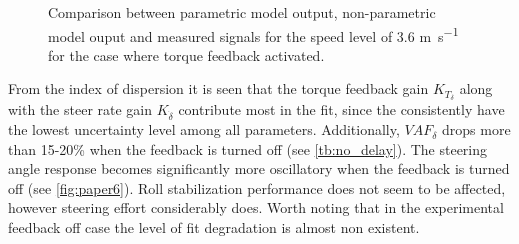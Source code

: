 \begin{figure}[!h]
    \caption{Comparison between parametric model output, non-parametric model ouput and measured signals for the speed level of 3.6 \si{\meter\per\second} for the case where torque feedback activated.}
    \label{fig:paper5}
\end{figure}


From the index of dispersion it is seen that the torque feedback gain \ensuremath{K_{T_\delta}} along with the steer rate gain \ensuremath{K_{\dot{\delta}}} contribute most in the fit, since the consistently have the lowest uncertainty level among all parameters. Additionally, \ensuremath{\mathit{VAF}_\delta} drops more than 15-20\% when the feedback is turned off (see \cref{tb:no_delay}). The steering angle response   becomes significantly more oscillatory when the feedback is turned off (see \cref{fig:paper6}). Roll stabilization performance does not seem to be affected, however steering effort considerably does. Worth noting that in the experimental feedback off case the level of fit degradation is almost non existent.


